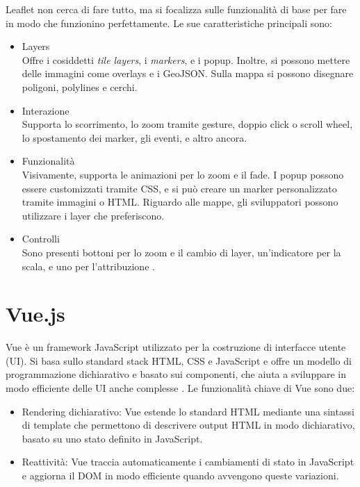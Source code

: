 Leaflet non cerca di fare tutto, ma si focalizza sulle funzionalità di base per fare in modo che funzionino perfettamente. Le sue caratteristiche principali sono:
\begin{itemize}
    \item Layers\\
    Offre i cosiddetti \textit{tile layers}, i \textit{markers}, e i popup. Inoltre, si possono mettere delle immagini come overlays e i GeoJSON. Sulla mappa si possono disegnare poligoni, polylines e cerchi.
    \item Interazione\\
    Supporta lo scorrimento, lo zoom tramite gesture, doppio click o scroll wheel, lo spostamento dei marker, gli eventi, e altro ancora.
    \item Funzionalità\\
    Visivamente, supporta le animazioni per lo zoom e il fade. I popup possono essere customizzati tramite CSS, e si può creare un marker personalizzato tramite immagini o HTML. Riguardo alle mappe, gli sviluppatori possono utilizzare i layer che preferiscono.
    \item Controlli\\
    Sono presenti bottoni per lo zoom e il cambio di layer, un'indicatore per la scala, e uno per l'attribuzione \cite{Leaflet_Overview}.
\end{itemize}

\section{Vue.js}
Vue è un framework JavaScript utilizzato per la costruzione di interfacce utente (UI). Si basa sullo standard stack HTML, CSS e JavaScript e offre un modello di programmazione dichiarativo e basato sui componenti, che aiuta a sviluppare in modo efficiente delle UI anche complesse \cite{Vue}. Le funzionalità chiave di Vue sono due:
\begin{itemize}
    \item Rendering dichiarativo: Vue estende lo standard HTML mediante una sintassi di template che permettono di descrivere output HTML in modo dichiarativo, basato su uno stato definito in JavaScript.
    \item Reattività: Vue traccia automaticamente i cambiamenti di stato in JavaScript e aggiorna il DOM in modo efficiente quando avvengono queste variazioni.
\end{itemize}

